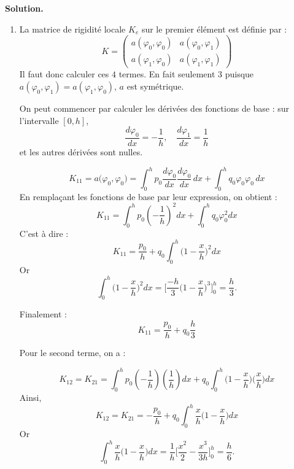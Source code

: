 \documentclass[11pt,a4paper]{report}
\newenvironment{solution}
{
    \vspace{0.5em}
    \begin{mdframed}[backgroundcolor=ThemeLight,leftmargin=0,rightmargin=0,skipabove=0.2em,skipbelow=0.2em]
    \textbf{Solution.}\\[0.5em]
}
{
    \end{mdframed}
    \vspace{0.5em}
}
\begin{document}
\begin{enumerate}[itemsep=0.5em]
{\begin{solution}
\begin{enumerate}
            \item La matrice de rigidité locale \( K_e \) sur le premier élément est définie par :
            \[
            K = \left(
                \begin{array}{cc}
                    a(\varphi_0, \varphi_0) & a(\varphi_0, \varphi_1) \\
                    a(\varphi_1, \varphi_0) & a(\varphi_1, \varphi_1)
                \end{array}
            \right)
            \]
            Il faut donc calculer ces $4$ termes. En fait seulement $3$ puisque $a(\varphi_0, \varphi_1) = a(\varphi_1, \varphi_0)$, $a$ est symétrique.

            On peut commencer par calculer les dérivées des fonctions de base : sur l'intervalle $[0,h]$,
            \[
            \frac{d\varphi_0}{dx} = -\frac{1}{h}, \quad \frac{d\varphi_1}{dx} = \frac{1}{h}
            \]
            et les autres dérivées sont nulles.

            \[
            K_{11} = a\big(\varphi_0, \varphi_0\big) = \int_{0}^{h} p_0 \frac{d\varphi_0}{dx} \frac{d\varphi_0}{dx} \, dx + \int_{0}^{h} q_0 \varphi_0 \varphi_0 \, dx
            \]
            En remplaçant les fonctions de base par leur expression, on obtient :
            \[
            K_{11} = \int_{0}^{h} p_0 \left( -\frac{1}{h} \right)^2 dx + \int_{0}^{h} q_0 \varphi_0^2 dx
            \]
            C'est à dire :
            \[
            K_{11} = \frac{p_0}{h} + q_0 \int_{0}^{h} \Big(1 - \frac{x}{h}\Big)^2 dx 
            \]  
            Or 
            \[\int_{0}^{h} \Big(1 - \frac{x}{h}\Big)^2 dx = \Big[\frac{-h}{3}\Big(1 - \frac{x}{h}\Big)^3\Big]_{0}^{h} = \frac{h}{3}.\]

            Finalement :
            \[
            K_{11} = \frac{p_0}{h} + q_0 \frac{h}{3}
            \]
            
            Pour le second terme, on a :

            \[
            K_{12} = K_{21} = \int_{0}^{h} p_0 \left( -\frac{1}{h} \right) \left( \frac{1}{h} \right) dx + q_0 \int_{0}^{h} \Big(1 - \frac{x}{h}\Big) \Big(\frac{x}{h}\Big) dx
            \]
            Ainsi, 
            \[
            K_{12} = K_{21} = -\frac{p_0}{h} + q_0 \int_{0}^{h} \frac{x}{h} \Big(1 - \frac{x}{h}\Big)  dx
            \]
            Or 
            \[\int_{0}^{h} \frac{x}{h}\Big(1 - \frac{x}{h}\Big)  dx = \frac{1}{h}\Big[\frac{x^2}{2} - \frac{x^3}{3h}\Big]_{0}^{h} = \frac{h}{6}.\]


\end{enumerate}
\end{solution}}
\end{enumerate}
\end{document}
